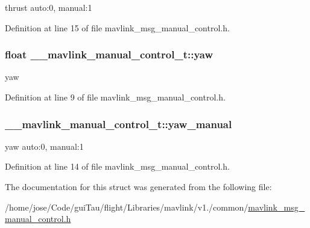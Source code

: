 thrust auto\-:0, manual\-:1 



Definition at line 15 of file mavlink\-\_\-msg\-\_\-manual\-\_\-control.\-h.

\hypertarget{struct____mavlink__manual__control__t_ad96255477bb078c1d23aa4d896d23ec4}{
\subsubsection[{yaw}]{\setlength{\rightskip}{0pt plus 5cm}float \-\_\-\-\_\-mavlink\-\_\-manual\-\_\-control\-\_\-t\-::yaw}}\label{struct____mavlink__manual__control__t_ad96255477bb078c1d23aa4d896d23ec4}


yaw 



Definition at line 9 of file mavlink\-\_\-msg\-\_\-manual\-\_\-control.\-h.

\hypertarget{struct____mavlink__manual__control__t_a79127e569fdb1e9245f5546aac2a4346}{
\subsubsection[{yaw\-\_\-manual}]{ \-\_\-\-\_\-mavlink\-\_\-manual\-\_\-control\-\_\-t\-::yaw\-\_\-manual}}\label{struct____mavlink__manual__control__t_a79127e569fdb1e9245f5546aac2a4346}


yaw auto\-:0, manual\-:1 



Definition at line 14 of file mavlink\-\_\-msg\-\_\-manual\-\_\-control.\-h.



The documentation for this struct was generated from the following file\-:\begin{DoxyCompactItemize}
\item 
/home/jose/\-Code/gui\-Tau/flight/\-Libraries/mavlink/v1./common/\hyperlink{mavlink__msg__manual__control_8h}{mavlink\-\_\-msg\-\_\-manual\-\_\-control.\-h}\end{DoxyCompactItemize}
